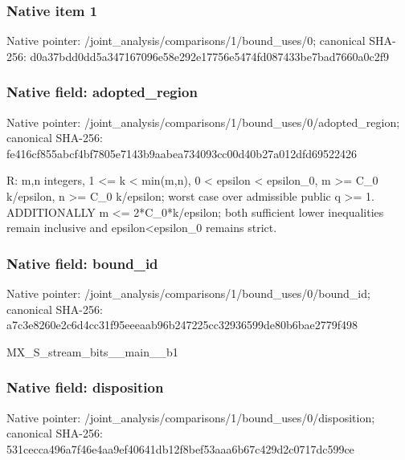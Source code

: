 \documentclass[10pt,a4paper]{article}
\begin{document}
\subsubsection{Native item 1}
Native pointer: /joint\_\allowbreak{}analysis/comparisons/1/bound\_\allowbreak{}uses/0; canonical SHA-256: d0a37bdd0dd5a347167096e58e292e17756e5474fd087433be7bad7660a0c2f9

\subsubsection{Native field: adopted\_\allowbreak{}region}
Native pointer: /joint\_\allowbreak{}analysis/comparisons/1/bound\_\allowbreak{}uses/0/adopted\_\allowbreak{}region; canonical SHA-256: fe416cf855abcf4bf7805e7143b9aabea734093cc00d40b27a012dfd69522426

\begingroup\raggedright\sloppy R:\allowbreak{} m,\allowbreak{}n integers,\allowbreak{} 1 <=\allowbreak{} k < min(m,\allowbreak{}n),\allowbreak{} 0 < epsilon < epsilon\_\allowbreak{}0,\allowbreak{} m >=\allowbreak{} C\_\allowbreak{}0 k/\allowbreak{}epsilon,\allowbreak{} n >=\allowbreak{} C\_\allowbreak{}0 k/\allowbreak{}epsilon;\allowbreak{} worst case over admissible public q >=\allowbreak{} 1. ADDITIONALLY m <=\allowbreak{} 2*C\_\allowbreak{}0*k/\allowbreak{}epsilon;\allowbreak{} both sufficient lower inequalities remain inclusive and epsilon<epsilon\_\allowbreak{}0 remains strict.\par\endgroup

\subsubsection{Native field: bound\_\allowbreak{}id}
Native pointer: /joint\_\allowbreak{}analysis/comparisons/1/bound\_\allowbreak{}uses/0/bound\_\allowbreak{}id; canonical SHA-256: a7c3e8260e2c6d4cc31f95eeeaab96b247225cc32936599de80b6bae2779f498

\begingroup\raggedright\sloppy MX\_\allowbreak{}S\_\allowbreak{}stream\_\allowbreak{}bits\_\allowbreak{}\_\allowbreak{}main\_\allowbreak{}\_\allowbreak{}b1\par\endgroup

\subsubsection{Native field: disposition}
Native pointer: /joint\_\allowbreak{}analysis/comparisons/1/bound\_\allowbreak{}uses/0/disposition; canonical SHA-256: 531cecca496a7f46e4aa9ef40641db12f8bef53aaa6b67c429d2c0717dc599ce
\end{document}
